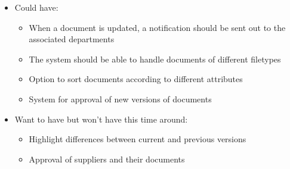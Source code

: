 \begin{itemize}
\begin{itemize}
        \end{itemize}
    \item Could have:
        \begin{itemize}
            \item When a document is updated, a notification should be sent out to the associated departments
            \item The system should be able to handle documents of different filetypes
            \item Option to sort documents according to different attributes
            \item System for approval of new versions of documents
        \end{itemize}
    \item Want to have but won't have this time around:
        \begin{itemize}
            \item Highlight differences between current and previous versions
            \item Approval of suppliers and their documents
        \end{itemize}
\end{itemize}
